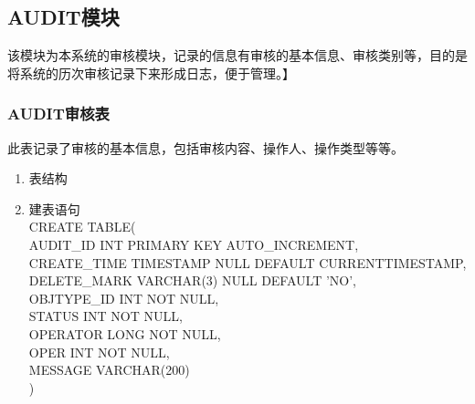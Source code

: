 \subsection{AUDIT模块}
该模块为本系统的审核模块，记录的信息有审核的基本信息、审核类别等，目的是将系统的历次审核记录下来形成日志，便于管理。】
\subsubsection{AUDIT审核表}
此表记录了审核的基本信息，包括审核内容、操作人、操作类型等等。
\begin{enumerate}
    \item 表结构
    \begin{table}[htbp]
        \centering
        \end{table}
    \item 建表语句\\
        CREATE TABLE(\\
            AUDIT\_ID INT PRIMARY KEY AUTO\_INCREMENT,\\
            CREATE\_TIME TIMESTAMP NULL DEFAULT CURRENTTIMESTAMP,\\
            DELETE\_MARK VARCHAR(3) NULL DEFAULT 'NO',\\
            OBJTYPE\_ID INT NOT NULL,\\
            STATUS  INT NOT NULL,\\
            OPERATOR LONG NOT NULL,\\
            OPER INT NOT NULL,\\
            MESSAGE VARCHAR(200) \\
        )
    \end{enumerate}

